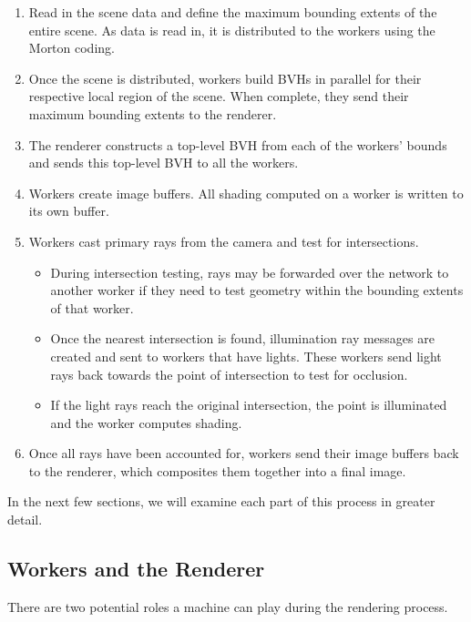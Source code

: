 \documentclass[a4paper,twoside]{article}
\begin{document}
\begin{enumerate}
    \item Read in the scene data and define the maximum bounding extents of the
        entire scene. As data is read in, it is distributed to the workers using
        the Morton coding.
    \item Once the scene is distributed, workers build BVHs in parallel for
        their respective local region of the scene. When complete, they send
        their maximum bounding extents to the renderer.
    \item The renderer constructs a top-level BVH from each of the workers'
        bounds and sends this top-level BVH to all the workers.
    \item Workers create image buffers. All shading computed on a worker is
        written to its own buffer. 
    \item Workers cast primary rays from the camera and test for intersections.
        \begin{itemize}
            \item During intersection testing, rays may be forwarded over the
                network to another worker if they need to test geometry within
                the bounding extents of that worker.
            \item Once the nearest intersection is found, illumination ray
                messages are created and sent to workers that have lights.
                These workers send light rays back towards the point of
                intersection to test for occlusion.
            \item If the light rays reach the original intersection, the point
                is illuminated and the worker computes shading.
        \end{itemize}
    \item Once all rays have been accounted for, workers send their image
        buffers back to the renderer, which composites them together into a
        final image.
\end{enumerate}

In the next few sections, we will examine each part of this process in greater
detail.

\subsection{Workers and the Renderer}
\label{workers}

There are two potential roles a machine can play during the rendering process.
\end{document}
